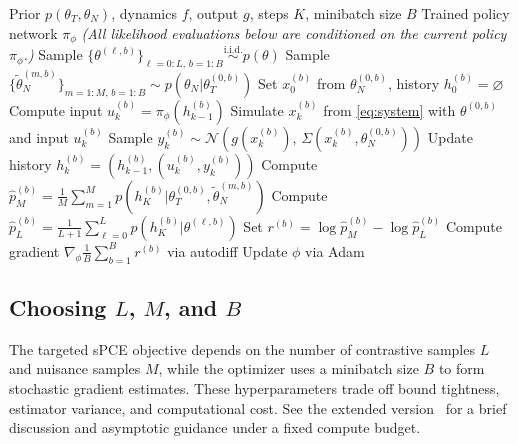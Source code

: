 \documentclass[conference]{IEEEtran}
\newif\ifextended
\begin{document}
\begin{algorithm}[t]
\caption{Targeted Deep Adaptive Design for MBDOE}
\label{algo:DAD}
\begin{algorithmic}[1]
\REQUIRE Prior $p(\theta_T, \theta_N)$, dynamics $f$, output $g$, steps $K$, minibatch size $B$
\ENSURE Trained policy network $\pi_\phi$
    \STATE \textit{(All likelihood evaluations below are conditioned on the current policy $\pi_\phi$.)}
    \STATE Sample $\{\theta^{(\ell,b)}\}_{\ell=0:L,\,b=1:B} \overset{\text{i.i.d.}}{\sim} p(\theta)$
    \STATE Sample $\{\tilde{\theta}_N^{(m,b)}\}_{m=1:M,\,b=1:B} \sim p(\theta_N|\theta_T^{(0,b)})$
        \STATE Set $x_0^{(b)}$ from $\theta_N^{(0,b)}$, history $h_0^{(b)} = \varnothing$
            \STATE Compute input $u_k^{(b)} = \pi_\phi(h_{k-1}^{(b)})$
            \STATE Simulate $x_k^{(b)}$ from \eqref{eq:system} with $\theta^{(0,b)}$ and input $u_k^{(b)}$
            \STATE Sample $y_k^{(b)} \sim \mathcal{N}(g(x_k^{(b)}),\, \Sigma(x_k^{(b)}, \theta_N^{(0,b)}))$
            \STATE Update history $h_k^{(b)} = (h_{k-1}^{(b)}, (u_k^{(b)}, y_k^{(b)}))$
        \ENDFOR
        \STATE Compute $\widehat p_M^{(b)} = \frac{1}{M}\sum_{m=1}^{M} p(h_K^{(b)}|\theta_T^{(0,b)}, \tilde{\theta}_N^{(m,b)})$
        \STATE Compute $\widehat p_L^{(b)} = \frac{1}{L+1}\sum_{\ell=0}^{L} p(h_K^{(b)}|\theta^{(\ell,b)})$
        \STATE Set $r^{(b)} = \log \widehat p_M^{(b)} - \log \widehat p_L^{(b)}$
    \ENDFOR
    \STATE Compute gradient $\nabla_\phi \frac{1}{B}\sum_{b=1}^{B} r^{(b)}$ via autodiff
    \STATE Update $\phi$ via Adam
\ENDWHILE
\end{algorithmic}
\end{algorithm}

\subsection{Choosing $L$, $M$, and $B$}
The targeted sPCE objective depends on the number of contrastive samples $L$ and nuisance samples $M$, while the optimizer uses a minibatch size $B$ to form stochastic gradient estimates.
These hyperparameters trade off bound tightness, estimator variance, and computational cost.
\ifextended See Appendix~\ref{sec:budget_stub} for a brief discussion and asymptotic guidance under a fixed compute budget.\else{} See the extended version~\cite{strouwen2026extended} for a brief discussion and asymptotic guidance under a fixed compute budget.\fi
\end{document}
